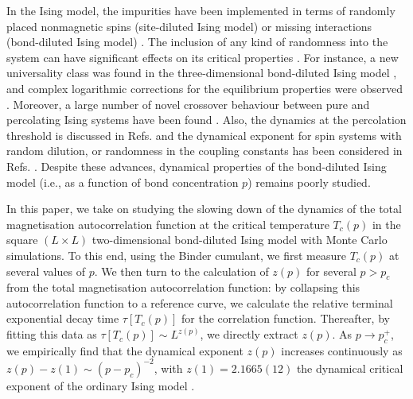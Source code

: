 \documentclass[12pt,nofootinbib,aps,amsmath,amssymb,preprint,showpacs]{revtex4}
\begin{document}
In the Ising model, the impurities have been implemented in terms of
randomly placed nonmagnetic spins (site-diluted Ising model)
\cite{balle1,balle2,martins,kim,kenna} or missing interactions (bond-diluted
Ising model) \cite{shalaev,jayap,loh,hasen,rivera}. The inclusion of
any kind of randomness into the system can have significant effects on
its critical properties \cite{alba}. For instance, a new universality
class was found in the three-dimensional bond-diluted Ising model
\cite{hasen2,fytas}, and complex logarithmic corrections for the
equilibrium properties were observed \cite{kenna,wang}. Moreover, a
large number of novel crossover behaviour between pure and percolating
Ising systems have been found
\cite{heuer,mouri,tomita,jassen2,heuer2,domany}. Also, the dynamics at the percolation threshold is discussed in Refs. \cite{harris0,jain} and the dynamical exponent for spin systems with random dilution, or randomness in the coupling constants has been considered in Refs. \cite{prud,paris,ivaney,henk,lipp}. Despite these
advances, dynamical properties of the bond-diluted Ising model (i.e.,
as a function of bond concentration $p$) remains poorly studied.

In this paper, we take on studying the slowing down of the dynamics of
the total magnetisation autocorrelation function at the critical
temperature $T_c(p)$ in the square $(L\times L)$ two-dimensional
bond-diluted Ising model with Monte Carlo simulations. To this end,
using the Binder cumulant, we first measure $T_c(p)$ at several values
of $p$. We then turn to the calculation of $z(p)$ for several $p>p_c$
from the total magnetisation autocorrelation function: by collapsing
this autocorrelation function to a reference curve, we calculate the
relative terminal exponential decay time $\tau[T_c(p)]$ for the
correlation function. Thereafter, by fitting this data as
$\tau[T_c(p)]\sim L^{z(p)}$, we directly extract $z(p)$. As
$p\rightarrow p_c^+$, we empirically find that the dynamical exponent
$z(p)$ increases continuously as $z(p)-z(1)\sim(p-p_c)^{-2}$, with
$z(1)=2.1665(12)$ the dynamical critical exponent of the ordinary
Ising model \cite{night}.
\end{document}
